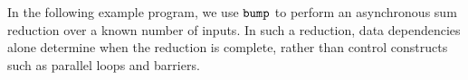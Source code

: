 


In the following example program, we use $\mbox{\texttt{bump}}$ to perform an
asynchronous sum reduction over a known
number of inputs.  {In such a reduction, data dependencies
alone determine when the reduction is complete, rather than control constructs
such as parallel loops and barriers.}

